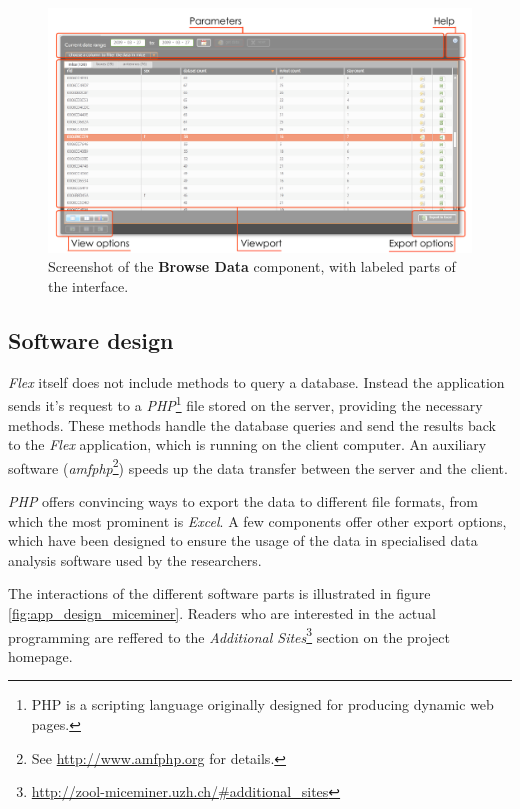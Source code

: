\begin{figure}[!htbp]
\begin{center}
  \includegraphics[width=.75\textwidth]{assets/pdf/interface_component.pdf}
  \caption[miceminer coponent interface]{Screenshot of the \textbf{Browse Data} component, with labeled parts of the interface.}
  \label{fig:interface_component}
\end{center}
\end{figure}

\subsection{Software design}
\label{subsec:miceminer_design}   

\textit{Flex} itself does not include methods to query a database. Instead the application sends it's request to a \textit{PHP}\footnote{PHP is a scripting language originally designed for producing dynamic web pages\cite{wiki:php}.} file stored on the server, providing the necessary methods. These methods handle the database queries and send the results back to the \textit{Flex} application, which is running on the client computer. An auxiliary software (\textit{amfphp}\footnote{See \href{http://www.amfphp.org}{http://www.amfphp.org} for details.}) speeds up the data transfer between the server and the client.

\textit{PHP} offers convincing ways to export the data to different file formats, from which the most prominent is \textit{Excel}. A few components offer other export options, which have been designed to ensure the usage of the data in specialised data analysis software used by the researchers.

The interactions of the different software parts is illustrated in figure \ref{fig:app_design_miceminer}. Readers who are interested in the actual programming are reffered to the \textit{Additional Sites}\footnote{\href{http://zool-miceminer.uzh.ch/\#additional_sites}{http://zool-miceminer.uzh.ch/\#additional\_sites}} section on the project homepage.   


